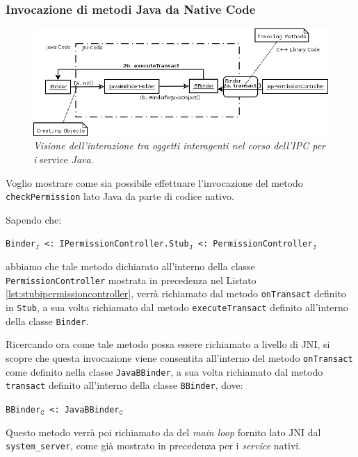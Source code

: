 \subsubsection{Invocazione di metodi Java da Native Code}\label{subsec:invoke}
\begin{figure}[thp]
\centering
\includegraphics[scale=0.65]{img/modelio/cpplevel.png}
\caption{\textit{Visione dell'interazione tra oggetti interagenti nel corso dell'IPC per i}
service \textit{Java}.}
\label{fig:binderlowlevel}
\end{figure}
Voglio mostrare come sia possibile effettuare l'invocazione del metodo \texttt{\small checkPermission}
lato Java da parte di codice nativo.

Sapendo che:
\begin{center}
\texttt{\small Binder$_\mathtt{J}$ <: IPermissionController.Stub$_\mathtt{J}$ <: PermissionController$_\mathtt{J}$}
\end{center}
abbiamo che tale metodo dichiarato all'interno della classe \texttt{\small PermissionController}
mostrata in precedenza nel Listato \vref{lst:stubipermissioncontroller}, verrà
richiamato dal metodo \texttt{\small onTransact} definito in \texttt{\small Stub},
a sua volta richiamato dal metodo \texttt{\small executeTransact} definito all'interno
della classe \texttt{\small Binder}.

Ricercando ora come tale metodo possa essere richiamato a livello di JNI,
si scopre che questa invocazione viene consentita all'interno del metodo
\texttt{\small onTransact} come definito nella classe \texttt{\small JavaBBinder},
a sua volta richiamato dal metodo \texttt{\small transact} definito all'interno
della classe \texttt{\small BBinder}, dove:
\begin{center}
\texttt{\small BBinder$_\mathtt{C}$ <: JavaBBinder$_\mathtt{C}$}
\end{center}

Questo metodo verrà poi richiamato da del \textit{main loop} fornito lato JNI dal 
\texttt{\small system\_server}, come già mostrato in precedenza per i \textit{service}
nativi.


